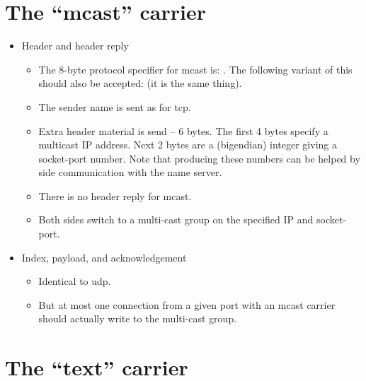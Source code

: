 \section{The ``mcast'' carrier}

\begin{itemize}

\item{Header and header reply}

  \begin{itemize}
    
  \item The 8-byte protocol specifier for mcast is: .  The following variant of this should also be
    accepted:  (it is the same
    thing).

  \item The sender name is sent as for tcp.

  \item Extra header material is send -- 6 bytes.  The first 4 bytes
  specify a multicast IP address.  Next 2 bytes are a (bigendian)
  integer giving a socket-port number.  Note that producing these
  numbers can be helped by side communication with the name server.

  \item There is no header reply for mcast.
  
  \item Both sides switch to a multi-cast group on the specified IP
  and socket-port.

  \end{itemize}

\item{Index, payload, and acknowledgement}

  \begin{itemize}

  \item Identical to udp.

  \item But at most one connection from a given port with an mcast carrier
    should actually write to the multi-cast group.

  \end{itemize}
  
\end{itemize}



\section{The ``text'' carrier}

